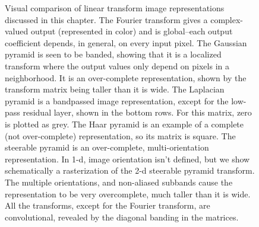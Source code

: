 \begin{figure}
\centerline{
}
\caption{Visual comparison of linear transform image representations
  discussed in this chapter.  The Fourier transform gives a
  complex-valued output (represented in color) and is global--each
  output coefficient depends, in general, on every input pixel.  The
  Gaussian pyramid is seen to be banded, showing that it is a
  localized transform where the output values only depend on pixels in
a neighborhood.  It is an over-complete representation, shown by the
transform matrix being taller than it is wide.  
The Laplacian pyramid
is a bandpassed image representation, except for the low-pass residual
layer, shown in the bottom rows. For this matrix, zero is plotted as
grey.  The Haar pyramid is an example of a complete (not
over-complete) representation, so its matrix is square.  The steerable
pyramid is an over-complete, multi-orientation representation.  In 1-d, image orientation
isn't defined, but we show schematically a rasterization of the 2-d
steerable pyramid transform.  The multiple orientations, and
non-aliased subbands cause the representation to be very overcomplete,
much taller than it is wide.
All the transforms,
except for the Fourier transform, are convolutional, revealed by the
diagonal banding in the matrices. 
}
\label{fig:steerpyr}
\end{figure}










